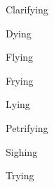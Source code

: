 \begin{description}

    \item Clarifying
    \item Dying
    \item Flying
    \item Frying
    \item Lying
    \item Petrifying
    \item Sighing
    \item Trying

\end{description}
